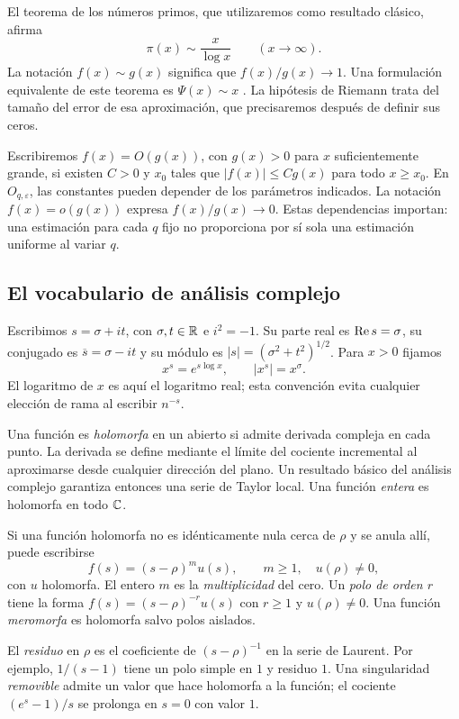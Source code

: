 El teorema de los números primos, que utilizaremos como resultado clásico,
afirma
\begin{equation}
 \pi(x)\sim\frac{x}{\log x}\qquad(x\longrightarrow\infty).
 \label{eq:intro-pnt}
\end{equation}
La notación $f(x)\sim g(x)$ significa que $f(x)/g(x)\to1$.
Una formulación equivalente de este teorema es $\Psi(x)\sim x$
\cite[§25.16(i)]{dlmf-zeta}. La hipótesis de Riemann trata del tamaño
del error de esa aproximación, que precisaremos después de definir sus
ceros.

Escribiremos $f(x)=O(g(x))$, con $g(x)>0$ para $x$ suficientemente grande,
si existen $C>0$ y $x_0$ tales que $|f(x)|\le Cg(x)$ para todo $x\ge x_0$.
En $O_{q,\varepsilon}$, las constantes pueden depender de los parámetros
indicados. La notación $f(x)=o(g(x))$ expresa $f(x)/g(x)\to0$.
Estas dependencias importan: una estimación para cada $q$ fijo no proporciona
por sí sola una estimación uniforme al variar $q$.

\subsection{El vocabulario de análisis complejo}

Escribimos $s=\sigma+it$, con $\sigma,t\in\mathbb{R}$ e $i^2=-1$.
Su parte real es $\operatorname{Re} s=\sigma$, su conjugado es $\overline s=\sigma-it$
y su módulo es $|s|=(\sigma^2+t^2)^{1/2}$. Para $x>0$ fijamos
\[
 x^s=e^{s\log x},\qquad |x^s|=x^\sigma.
\]
El logaritmo de $x$ es aquí el logaritmo real; esta convención evita
cualquier elección de rama al escribir $n^{-s}$.

Una función es \emph{holomorfa} en un abierto si admite derivada compleja
en cada punto. La derivada se define mediante el límite del cociente
incremental al aproximarse desde cualquier dirección del plano. Un
resultado básico del análisis complejo garantiza entonces una serie de
Taylor local. Una función \emph{entera} es holomorfa en todo $\mathbb{C}$.

Si una función holomorfa no es idénticamente nula cerca de $\rho$ y se anula
allí, puede escribirse
\[
 f(s)=(s-\rho)^m u(s),\qquad m\ge1,\quad u(\rho)\ne0,
\]
con $u$ holomorfa. El entero $m$ es la \emph{multiplicidad} del cero.
Un \emph{polo de orden $r$} tiene la forma
$f(s)=(s-\rho)^{-r}u(s)$ con $r\ge1$ y $u(\rho)\ne0$.
Una función \emph{meromorfa} es holomorfa salvo polos aislados.

El \emph{residuo} en $\rho$ es el coeficiente de $(s-\rho)^{-1}$ en la
serie de Laurent. Por ejemplo, $1/(s-1)$ tiene un polo simple en $1$ y
residuo $1$. Una singularidad \emph{removible} admite un valor que hace
holomorfa a la función; el cociente $(e^s-1)/s$ se prolonga en $s=0$
con valor $1$.

